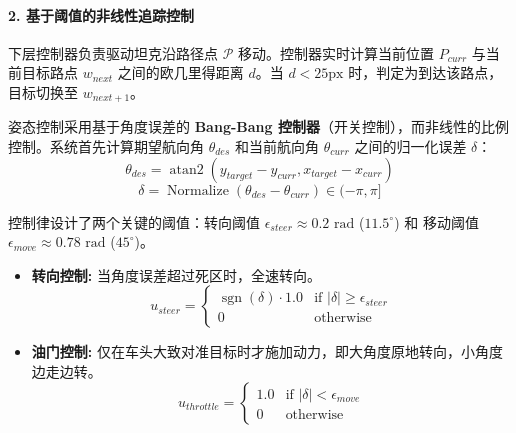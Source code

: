 \documentclass[conference]{IEEEtran}
\begin{document}
\paragraph{2. 基于阈值的非线性追踪控制}
下层控制器负责驱动坦克沿路径点 $\mathcal{P}$ 移动。控制器实时计算当前位置 $P_{curr}$ 与当前目标路点 $w_{next}$ 之间的欧几里得距离 $d$。当 $d < 25\text{px}$ 时，判定为到达该路点，目标切换至 $w_{next+1}$。

姿态控制采用基于角度误差的 \textbf{Bang-Bang 控制器}（开关控制），而非线性的比例控制。系统首先计算期望航向角 $\theta_{des}$ 和当前航向角 $\theta_{curr}$ 之间的归一化误差 $\delta$：
\begin{equation}
    \theta_{des} = \operatorname{atan2}(y_{target} - y_{curr}, x_{target} - x_{curr})
\end{equation}
\begin{equation}
    \delta = \operatorname{Normalize}(\theta_{des} - \theta_{curr}) \in (-\pi, \pi]
\end{equation}

控制律设计了两个关键的阈值：转向阈值 $\epsilon_{steer} \approx 0.2 \text{ rad}$ ($11.5^\circ$) 和 移动阈值 $\epsilon_{move} \approx 0.78 \text{ rad}$ ($45^\circ$)。

\begin{itemize}
    \item \textbf{转向控制:} 当角度误差超过死区时，全速转向。
    \begin{equation}
        u_{steer} = \begin{cases} 
        \operatorname{sgn}(\delta) \cdot 1.0 & \text{if } |\delta| \ge \epsilon_{steer} \\
        0 & \text{otherwise}
        \end{cases}
    \end{equation}
    
    \item \textbf{油门控制:} 仅在车头大致对准目标时才施加动力，即大角度原地转向，小角度边走边转。
    \begin{equation}
        u_{throttle} = \begin{cases} 
        1.0 & \text{if } |\delta| < \epsilon_{move} \\
        0 & \text{otherwise}
        \end{cases}
    \end{equation}
\end{itemize}
\end{document}
